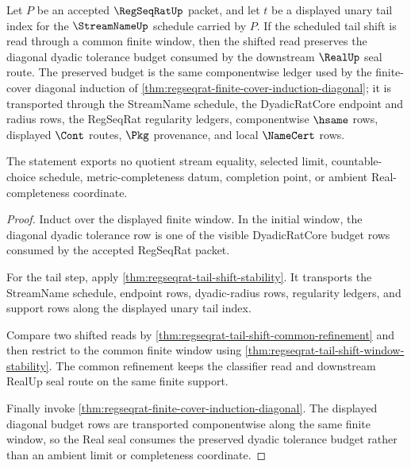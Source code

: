 \begin{theorem}
\label{thm:regseqrat-tail-shift-diagonal-budget}
Let $P$ be an accepted $\RegSeqRatUp$ packet, and let $t$ be a displayed unary
tail index for the $\StreamNameUp$ schedule carried by $P$. If the scheduled
tail shift is read through a common finite window, then the shifted read
preserves the diagonal dyadic tolerance budget consumed by the downstream
$\RealUp$ seal route. The preserved budget is the same componentwise ledger
used by the finite-cover diagonal induction of
\autoref{thm:regseqrat-finite-cover-induction-diagonal}; it is transported
through the StreamName schedule, the DyadicRatCore endpoint and radius rows,
the RegSeqRat regularity ledgers, componentwise $\hsame$ rows, displayed
$\Cont$ routes, $\Pkg$ provenance, and local $\NameCert$ rows.

The statement exports no quotient stream equality, selected limit,
countable-choice schedule, metric-completeness datum, completion point, or
ambient Real-completeness coordinate.
\end{theorem}
\begin{proof}
Induct over the displayed finite window. In the initial window, the diagonal
dyadic tolerance row is one of the visible DyadicRatCore budget rows consumed
by the accepted RegSeqRat packet.

For the tail step, apply
\autoref{thm:regseqrat-tail-shift-stability}. It transports the StreamName
schedule, endpoint rows, dyadic-radius rows, regularity ledgers, and support
rows along the displayed unary tail index.

Compare two shifted reads by
\autoref{thm:regseqrat-tail-shift-common-refinement} and then restrict to the
common finite window using
\autoref{thm:regseqrat-tail-shift-window-stability}. The common refinement
keeps the classifier read and downstream RealUp seal route on the same
finite support.

Finally invoke
\autoref{thm:regseqrat-finite-cover-induction-diagonal}. The displayed
diagonal budget rows are transported componentwise along the same finite
window, so the Real seal consumes the preserved dyadic tolerance budget rather
than an ambient limit or completeness coordinate.
\end{proof}

